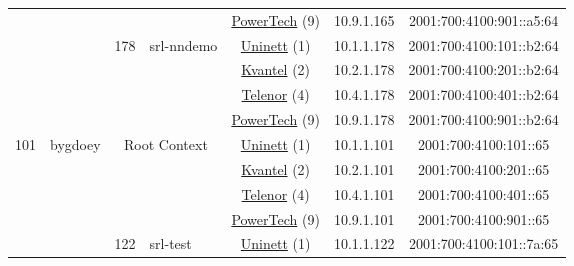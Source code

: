 \begin{small}
\begin{center}
\begin{longtable}{|c|c|c|c|c|c|c|c|}
  &  &  &  & \multicolumn{2}{|c|}{\tiny{\href{http://www.powertech.no}{PowerTech} (9)}} & \tiny{10.9.1.165} & \tiny{2001:700:4100:901::a5:64} \\* \cline{3-3}\cline{4-4}\cline{5-5}\cline{6-6}\cline{7-7}\cline{8-8}
  &  & \multirow{4}{*}{\tiny{178}} & \multicolumn{1}{|l|}{\multirow{4}{*}{\tiny{srl-nndemo}}} & \multicolumn{2}{|c|}{\tiny{\href{https://www.uninett.no}{Uninett} (1)}} & \tiny{10.1.1.178} & \tiny{2001:700:4100:101::b2:64} \\* \cline{5-5}\cline{6-6}\cline{7-7}\cline{8-8}
  &  &  &  & \multicolumn{2}{|c|}{\tiny{\href{http://kvantel.no}{Kvantel} (2)}} & \tiny{10.2.1.178} & \tiny{2001:700:4100:201::b2:64} \\* \cline{5-5}\cline{6-6}\cline{7-7}\cline{8-8}
  &  &  &  & \multicolumn{2}{|c|}{\tiny{\href{https://www.telenor.no}{Telenor} (4)}} & \tiny{10.4.1.178} & \tiny{2001:700:4100:401::b2:64} \\* \cline{5-5}\cline{6-6}\cline{7-7}\cline{8-8}
  &  &  &  & \multicolumn{2}{|c|}{\tiny{\href{http://www.powertech.no}{PowerTech} (9)}} & \tiny{10.9.1.178} & \tiny{2001:700:4100:901::b2:64} \\ \hline
 \multirow{36}{*}{\tiny{101}} & \multicolumn{1}{|l|}{\multirow{36}{*}{\tiny{bygdoey}}} & \multicolumn{2}{|c|}{\multirow{4}{*}{\tiny{Root Context}}} & \multicolumn{2}{|c|}{\tiny{\href{https://www.uninett.no}{Uninett} (1)}} & \tiny{10.1.1.101} & \tiny{2001:700:4100:101::65} \\* \cline{5-5}\cline{6-6}\cline{7-7}\cline{8-8}
  &  & \multicolumn{2}{|c|}{} & \multicolumn{2}{|c|}{\tiny{\href{http://kvantel.no}{Kvantel} (2)}} & \tiny{10.2.1.101} & \tiny{2001:700:4100:201::65} \\* \cline{5-5}\cline{6-6}\cline{7-7}\cline{8-8}
  &  & \multicolumn{2}{|c|}{} & \multicolumn{2}{|c|}{\tiny{\href{https://www.telenor.no}{Telenor} (4)}} & \tiny{10.4.1.101} & \tiny{2001:700:4100:401::65} \\* \cline{5-5}\cline{6-6}\cline{7-7}\cline{8-8}
  &  & \multicolumn{2}{|c|}{} & \multicolumn{2}{|c|}{\tiny{\href{http://www.powertech.no}{PowerTech} (9)}} & \tiny{10.9.1.101} & \tiny{2001:700:4100:901::65} \\* \cline{3-3}\cline{4-4}\cline{5-5}\cline{6-6}\cline{7-7}\cline{8-8}
  &  & \multirow{4}{*}{\tiny{122}} & \multicolumn{1}{|l|}{\multirow{4}{*}{\tiny{srl-test}}} & \multicolumn{2}{|c|}{\tiny{\href{https://www.uninett.no}{Uninett} (1)}} & \tiny{10.1.1.122} & \tiny{2001:700:4100:101::7a:65} \\* \cline{5-5}\cline{6-6}\cline{7-7}\cline{8-8}

\end{longtable}
\end{center}
\end{small}

